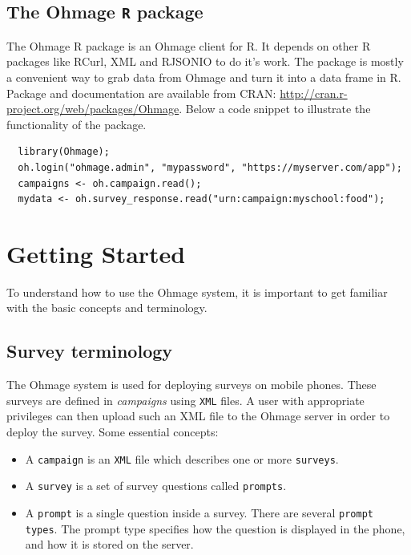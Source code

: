 \documentclass{scrartcl}
\begin{document}
\subsection{The Ohmage \texttt{R} package}

The Ohmage R package is an Ohmage client for R. It depends on other R packages
like RCurl, XML and RJSONIO to do it's work. The package is mostly a convenient
way to grab data from Ohmage and turn it into a data frame in R. Package and
documentation are available from CRAN:
\url{http://cran.r-project.org/web/packages/Ohmage}. Below a code snippet to
illustrate the functionality of the package.

\begin{verbatim}
  library(Ohmage);
  oh.login("ohmage.admin", "mypassword", "https://myserver.com/app");
  campaigns <- oh.campaign.read();
  mydata <- oh.survey_response.read("urn:campaign:myschool:food");
\end{verbatim}

\section{Getting Started}

To understand how to use the Ohmage system, it is important to get familiar with
the basic concepts and terminology.  

\subsection{Survey terminology}

The Ohmage system is used for deploying surveys on mobile phones. These surveys
are defined in \emph{campaigns} using \texttt{XML} files. A user with
appropriate privileges can then upload such an XML file to the Ohmage server in
order to deploy the survey. Some essential concepts:

\begin{itemize}
  \item A \texttt{campaign} is an \texttt{XML} file which describes one or more
  \texttt{surveys}. 
  \item A \texttt{survey} is a set of survey questions called \texttt{prompts}.
  \item A \texttt{prompt} is a single question inside a survey. There are
  several \texttt{prompt types}. The prompt type specifies how the question is
  displayed in the phone, and how it is stored on the server.
\end{itemize}
\end{document}
